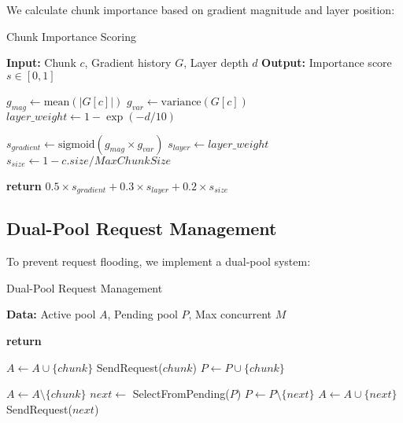 \documentclass[11pt,conference]{article}
\begin{document}
We calculate chunk importance based on gradient magnitude and layer position:

\begin{algorithm}
\caption{Chunk Importance Scoring}
\label{alg:importance-score}
\begin{algorithmic}[1]
\STATE \textbf{Input:} Chunk $c$, Gradient history $G$, Layer depth $d$
\STATE \textbf{Output:} Importance score $s \in [0, 1]$

    \STATE $g_{mag} \gets \text{mean}(|G[c]|)$ 
    \STATE $g_{var} \gets \text{variance}(G[c])$ 
    \STATE $layer\_weight \gets 1 - \exp(-d/10)$ 
    
    \STATE $s_{gradient} \gets \text{sigmoid}(g_{mag} \times g_{var})$
    \STATE $s_{layer} \gets layer\_weight$
    \STATE $s_{size} \gets 1 - c.size / MaxChunkSize$ 
    
    \STATE \textbf{return} $0.5 \times s_{gradient} + 0.3 \times s_{layer} + 0.2 \times s_{size}$
\ENDPROCEDURE
\end{algorithmic}
\end{algorithm}

\subsection{Dual-Pool Request Management}

To prevent request flooding, we implement a dual-pool system:

\begin{algorithm}
\caption{Dual-Pool Request Management}
\label{alg:dual-pool}
\begin{algorithmic}[1]
\STATE \textbf{Data:} Active pool $A$, Pending pool $P$, Max concurrent $M$

        \STATE \textbf{return} 
    \ENDIF
    
        \STATE $A \gets A \cup \{chunk\}$
        \STATE SendRequest($chunk$)
    \ELSE
        \STATE $P \gets P \cup \{chunk\}$ 
    \ENDIF
\ENDPROCEDURE

    \STATE $A \gets A \setminus \{chunk\}$
        \STATE $next \gets$ SelectFromPending($P$)
        \STATE $P \gets P \setminus \{next\}$
        \STATE $A \gets A \cup \{next\}$
        \STATE SendRequest($next$)
    \ENDIF
\ENDPROCEDURE
\end{algorithmic}
\end{algorithm}
\end{document}
